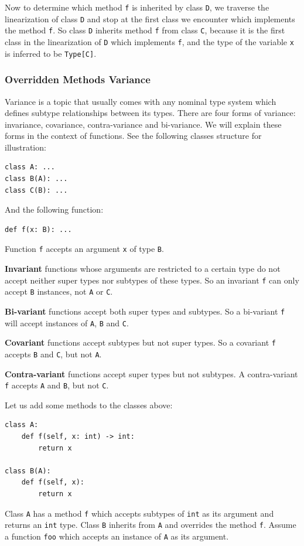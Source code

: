 Now to determine which method \lstinline|f| is inherited by class \lstinline|D|, we traverse the linearization of class \lstinline|D| and stop at the first class we encounter which implements the method \lstinline|f|. So class \lstinline|D| inherits method \lstinline|f| from class \lstinline|C|, because it is the first class in the linearization of \lstinline|D| which implements \lstinline|f|, and the type of the variable \lstinline|x| is inferred to be \lstinline|Type[C]|.

\subsubsection{Overridden Methods Variance}
Variance is a topic that usually comes with any nominal type system which defines subtype relationships between its types. There are four forms of variance: invariance, covariance, contra-variance and bi-variance. We will explain these forms in the context of functions. See the following classes structure for illustration:
\begin{lstlisting}
class A: ...
class B(A): ...
class C(B): ...
\end{lstlisting}

And the following function:
\begin{lstlisting}
def f(x: B): ...
\end{lstlisting}

Function \lstinline|f| accepts an argument \lstinline|x| of type \lstinline|B|.

\textbf{Invariant} functions whose arguments are restricted to a certain type do not accept neither super types nor subtypes of these types. So an invariant \lstinline|f| can only accept \lstinline|B| instances, not \lstinline|A| or \lstinline|C|.

\textbf{Bi-variant} functions accept both super types and subtypes. So a bi-variant \lstinline|f| will accept instances of \lstinline|A|, \lstinline|B| and \lstinline|C|.

\textbf{Covariant} functions accept subtypes but not super types. So a covariant \lstinline|f| accepts \lstinline|B| and \lstinline|C|, but not \lstinline|A|.

\textbf{Contra-variant} functions accept super types but not subtypes. A contra-variant \lstinline|f| accepts \lstinline|A| and \lstinline|B|, but not \lstinline|C|.

Let us add some methods to the classes above:

\begin{lstlisting}
class A:
	def f(self, x: int) -> int:
		return x
		
class B(A):
	def f(self, x):
		return x
\end{lstlisting}
Class \lstinline|A| has a method \lstinline|f| which accepts subtypes of \lstinline|int| as its argument and returns an \lstinline|int| type. Class \lstinline|B| inherits from \lstinline|A| and overrides the method \lstinline|f|. Assume a function \lstinline|foo| which accepts an instance of \lstinline|A| as its argument.

